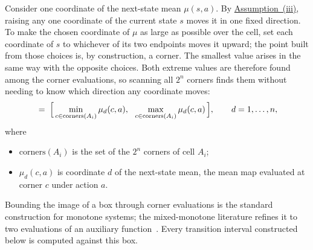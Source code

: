 \documentclass[11pt,a4paper]{article}
\theoremstyle{plain}
\theoremstyle{remark}
\begin{document}
	Consider one coordinate of the next-state mean $\mu(s, a)$. By
	\hyperref[ass:sysclass]{Assumption~(iii)}, raising any one
	coordinate of the current state $s$ moves it in one fixed direction.
	To make the chosen coordinate of $\mu$ as large as possible over the
	cell, set each coordinate of $s$ to whichever of its two endpoints
	moves it upward; the point built from those choices is, by
	construction, a corner. The smallest value arises in the same way
	with the opposite choices. Both extreme values are therefore found
	among the corner evaluations, so scanning all $2^n$ corners finds
	them without needing to know which direction any coordinate moves:
	\begin{equation}
		[\mu_d^{\text{lo}},\ \mu_d^{\text{hi}}] \;=\; \Bigl[\,
		\min_{c \in \text{corners}(A_i)} \mu_d(c, a),\ \
		\max_{c \in \text{corners}(A_i)} \mu_d(c, a) \,\Bigr],
		\qquad d = 1, \dots, n,
		\label{eq:imagebox}
	\end{equation}
	where
	\begin{itemize}
		\item $\text{corners}(A_i)$ is the set of the $2^n$ corners of cell
		$A_i$;
		\item $\mu_d(c, a)$ is coordinate $d$ of the next-state mean, the
		mean map evaluated at corner $c$ under action $a$.
	\end{itemize}
	
	Bounding the image of a box through corner evaluations is the
	standard construction for monotone systems; the mixed-monotone
	literature refines it to two evaluations of an auxiliary
	function~\cite{CA15}. Every transition interval constructed below is
	computed against this box.
	
	
	
\end{document}
